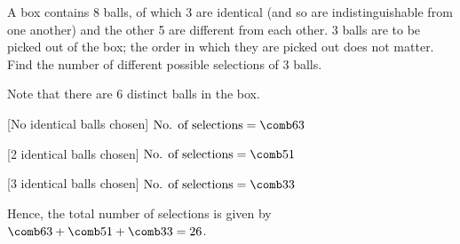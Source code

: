 \begin{problem}
    A box contains 8 balls, of which 3 are identical (and so are indistinguishable from one another) and the other 5 are different from each other. 3 balls are to be picked out of the box; the order in which they are picked out does not matter. Find the number of different possible selections of 3 balls.
\end{problem}
\begin{solution}
    Note that there are 6 distinct balls in the box.

    [No identical balls chosen] $\text{No. of selections} = \comb63$

    [2 identical balls chosen] $\text{No. of selections} = \comb51$

    [3 identical balls chosen] $\text{No. of selections} = \comb33$

    Hence, the total number of selections is given by $\comb63 + \comb51 + \comb33 = 26$.
\end{solution}

